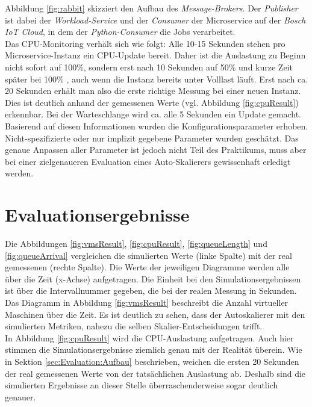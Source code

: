 \noindent
Abbildung \ref{fig:rabbit} skizziert den Aufbau des \textit{Message-Brokers}. Der \textit{Publisher} ist dabei der \textit{Workload-Service} und der \textit{Consumer} der Microservice auf der \textit{Bosch IoT Cloud}, in dem der \textit{Python-Consumer} die Jobs verarbeitet. \\
Das CPU-Monitoring verhält sich wie folgt: Alle 10-15 Sekunden stehen pro Microservice-Instanz ein CPU-Update bereit. Daher ist die Auslastung zu Beginn nicht sofort auf 100\%, sondern erst nach 10 Sekunden auf 50\% und kurze Zeit später bei 100\% , auch wenn die Instanz bereits unter Volllast läuft. Erst nach ca. 20 Sekunden erhält man also die erste richtige Messung bei einer neuen Instanz. Dies ist deutlich anhand der gemessenen Werte (vgl. Abbildung \ref{fig:cpuResult}) erkennbar. Bei der Warteschlange wird ca. alle 5 Sekunden ein Update gemacht. \\
Basierend auf diesen Informationen wurden die Konfigurationsparameter erhoben. Nicht-spezifizierte oder nur implizit gegebene Parameter wurden geschätzt. Das genaue Anpassen aller Parameter ist jedoch nicht Teil des Praktikums, muss aber bei einer zielgenaueren Evaluation eines Auto-Skalierers gewissenhaft erledigt werden.




\section{Evaluationsergebnisse}
Die Abbildungen \ref{fig:vmsResult}, \ref{fig:cpuResult}, \ref{fig:queueLength} und \ref{fig:queueArrival} vergleichen die simulierten Werte (linke Spalte) mit der real gemessenen (rechte Spalte). Die Werte der jeweiligen Diagramme werden alle über die Zeit (x-Achse) aufgetragen. Die Einheit bei den Simulationsergebnissen ist über die Intervallnummer gegeben, die bei der realen Messung in Sekunden. 
Das Diagramm in Abbildung \ref{fig:vmsResult} beschreibt die Anzahl virtueller Maschinen über die Zeit. Es ist deutlich zu sehen, dass der Autoskalierer mit den simulierten Metriken, nahezu die selben Skalier-Entscheidungen trifft. \\
In Abbildung \ref{fig:cpuResult} wird die CPU-Auslastung aufgetragen. Auch hier stimmen die Simulationsergebnisse ziemlich genau mit der Realität überein. Wie in Sektion \ref{sec:Evaluation:Aufbau} beschrieben, weichen die ersten 20 Sekunden der real gemessenen Werte von der tatsächlichen Auslastung ab. Deshalb sind die simulierten Ergebnisse an dieser Stelle überraschenderweise sogar deutlich genauer. \\




